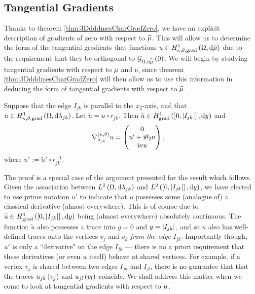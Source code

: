 \subsection{Tangential Gradients} \label{ssec:3DTangGradients}
Thanks to theorem \ref{thm:3DdddmesCharGradZero}, we have an explicit description of gradients of zero with respect to $\widetilde{\mu}$.
This will allow us to determine the form of the tangential gradients that functions $u\in H^1_{\kappa,\theta,\mathrm{grad}}\left( \Omega, \mathrm{d}\widetilde{\mu} \right)$ due to the requirement that they be orthogonal to $\mathcal{G}_{ \Omega, \mathrm{d}\widetilde{\mu}}\left( 0 \right)$.
We will begin by studying tangential gradients with respect to $\mu$ and $\nu$, since theorem \ref{thm:3DdddmesCharGradZero} will then allow us to use this information in deducing the form of tangential gradients with respect to $\widetilde{\mu}$.
\begin{prop} \label{prop:3DTangGradParallel}
	\sloppy Suppose that the edge $I_{jk}$ is parallel to the $x_2$-axis, and that $u\in H^1_{\kappa,\theta,\mathrm{grad}}\left( \Omega, \mathrm{d}\lambda_{jk} \right)$.
	Let $\widetilde{u} = u\circ r_{jk}$.
	Then $\widetilde{u}\in H^1_\mathrm{grad}\left( \left[ 0,\left\lvert I_{jk} \right\rvert \right], \mathrm{d}y \right)$ and
	\begin{align*}
		\nabla^{\left( \kappa, \theta \right)}_{\lambda_{jk}}u = 
		\begin{pmatrix}
			0 \\ u' + \mathrm{i}\theta_2 u \\ \mathrm{i}\kappa u
		\end{pmatrix},
	\end{align*}
	where $u' := \widetilde{u}'\circ r_{jk}^{-1}$.
\end{prop}
The proof is a special case of the argument presented for the result which follows.
Given the association between $L^{2}\left( \Omega,\mathrm{d}\lambda_{jk} \right)$ and $L^{2}\left( \left[ 0,\left\lvert I_{jk} \right\rvert \right],\mathrm{d}y \right)$, we have elected to use prime notation $u'$ to indicate that $u$ possesses some (analogue of) a classical derivative (almost everywhere).
This is of course due to $\widetilde{u}\in H^1_\mathrm{grad}\left( \left[ 0,\left\lvert I_{jk} \right\rvert \right], \mathrm{d}y \right)$ being (almost everywhere) absolutely continuous. 
The function $\widetilde{u}$ also possesses a trace into $y=0$ and $y=\left\lvert I_{jk} \right\rvert$, and so $u$ also has well-defined traces onto the vertices $v_j$ and $v_k$ \emph{from the edge $I_{jk}$}.
Importantly though, $u'$ is only a ``derivative" on the edge $I_{jk}$ --- there is no a priori requirement that these derivatives (or even $u$ itself) behave at shared vertices.
For example, if a vertex $v_j$ is shared between two edges $I_{jk}$ and $I_{jl}$, there is no guarantee that that the traces $u_{jk}\left( v_j \right)$ and $u_{jl}\left( v_l \right)$ coincide. 
We shall address this matter when we come to look at tangential gradients with respect to $\mu$.

